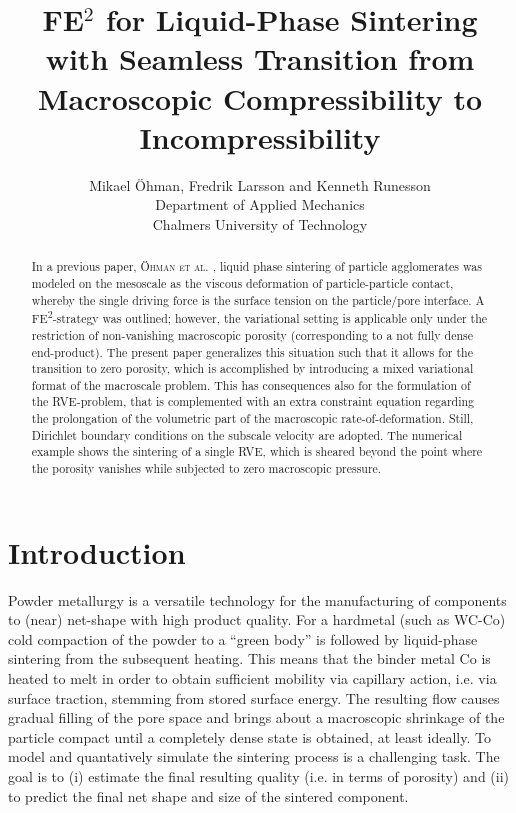 \documentclass[10pt,a4paper,fleqn]{article}
\begin{document}
\title{FE$^2$ for Liquid-Phase Sintering with Seamless Transition from Macroscopic Compressibility to Incompressibility}

\author{
Mikael Öhman, Fredrik Larsson and Kenneth Runesson\\
Department of Applied Mechanics \\
Chalmers University of Technology}

\maketitle

\begin{abstract}
\noindent In a previous paper, \textsc{Öhman et al.} \cite{Ohman2011a}, liquid phase sintering of particle agglomerates was modeled on the mesoscale as the viscous deformation of particle-particle contact, whereby the single driving force is the surface tension on the particle/pore interface. A FE\textsuperscript{2}-strategy was outlined; however, the variational setting is applicable only under the restriction of non-vanishing macroscopic porosity (corresponding to a not fully dense end-product). The present paper generalizes this situation such that it allows for the transition to zero porosity, which is accomplished by introducing a mixed variational format of the macroscale problem. This has consequences also for the formulation of the RVE-problem, that is complemented with an extra constraint equation regarding the prolongation of the volumetric part of the macroscopic rate-of-deformation.
Still, Dirichlet boundary conditions on the subscale velocity are adopted.
The numerical example shows the sintering of a single RVE, which is sheared beyond the point where the porosity vanishes while subjected to zero macroscopic pressure.

\end{abstract}

\section{Introduction}

Powder metallurgy is a versatile technology for the manufacturing of components to (near) net-shape with high product quality. For a hardmetal (such as WC-Co) cold compaction of the powder to a ``green body'' is followed by liquid-phase sintering from the subsequent heating. This means that the binder metal Co is heated to melt in order to obtain sufficient mobility via capillary action, i.e. via surface traction, stemming from stored surface energy. The resulting flow causes gradual filling of the pore space and brings about a macroscopic shrinkage of the particle compact until a completely dense state is obtained, at least ideally. To model and quantatively simulate the sintering process is a challenging task. The goal is to (i) estimate the final resulting quality (i.e. in terms of porosity) and (ii) to predict the final net shape and size of the sintered component.
\end{document}
